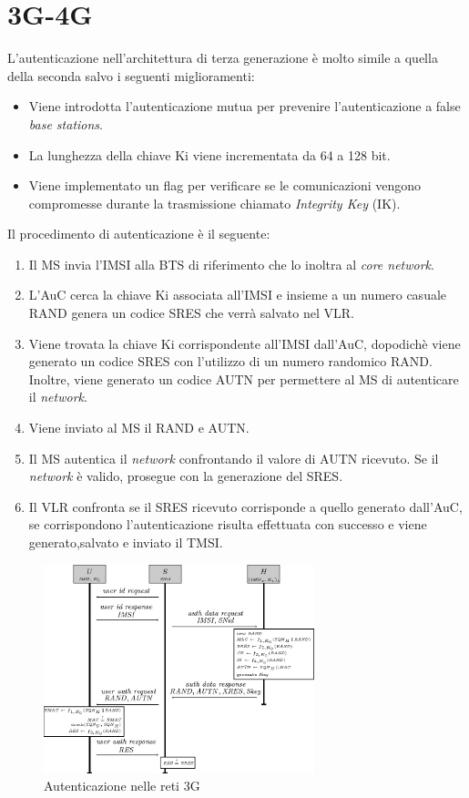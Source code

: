\section{3G-4G}
L'autenticazione nell'architettura di terza generazione è molto simile a quella della seconda salvo i seguenti miglioramenti:
\begin{itemize}
    \item Viene introdotta l'autenticazione mutua per prevenire l'autenticazione a false \textit{base stations}.
    \item La lunghezza della chiave Ki viene incrementata da 64 a 128 bit.
    \item Viene implementato un flag per verificare se le comunicazioni vengono compromesse durante la trasmissione chiamato \textit{Integrity Key} (IK).
\end{itemize}
Il procedimento di autenticazione è il seguente\cite{4g-auth}:
\begin{enumerate}
    \item Il MS invia l'IMSI alla BTS di riferimento che lo inoltra al \textit{core network}.
    \item L'AuC cerca la chiave Ki associata all'IMSI e insieme a un numero casuale RAND genera un codice SRES che verrà
    salvato nel VLR.
    \item Viene trovata la chiave Ki corrispondente all'IMSI dall'AuC, dopodichè viene generato un codice SRES con l'utilizzo di un numero randomico RAND.
    Inoltre, viene generato un codice AUTN per permettere al MS di autenticare il \textit{network}.
    \item Viene inviato al MS il RAND e AUTN.
    \item Il MS autentica il \textit{network} confrontando il valore di AUTN ricevuto. Se il \textit{network} è valido, prosegue con la generazione del SRES.
    \item Il VLR confronta se il SRES ricevuto corrisponde a quello generato dall'AuC, se corrispondono l'autenticazione risulta
    effettuata con successo e viene generato,salvato e inviato il TMSI.
\end{enumerate}
\begin{figure}[h]
    \centering
    \includegraphics[width=0.7\textwidth]{images/auth-3g.png}
    \caption{Autenticazione nelle reti 3G}
\end{figure}

